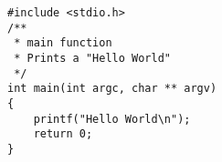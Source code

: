 \begin{lstlisting}
#include <stdio.h>
/**
 * main function
 * Prints a "Hello World"
 */
int main(int argc, char ** argv)
{
    printf("Hello World\n");
    return 0;
}
\end{lstlisting}
